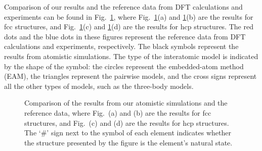 \documentclass[%
 reprint,
 amsmath,amssymb,
 aps,
]{revtex4-1}
\begin{document}
Comparison of our results and the reference data from DFT calculations and experiments can be found in Fig.~\ref{fig:compare}, where Fig.~\ref{fig:compare}(a) and \ref{fig:compare}(b) are the results for fcc structures, and Fig.~\ref{fig:compare}(c) and \ref{fig:compare}(d) are the results for hcp structures.
The red dots and the blue dots in these figures represent the reference data from DFT calculations and experiments, respectively.
The black symbols represent the results from atomistic simulations.
The type of the interatomic model is indicated by the shape of the symbol: the circles represent the embedded-atom method (EAM), the triangles represent the pairwise models, and the cross signs represent all the other types of models, such as the three-body models.
\noindent\begin{figure}
\centering
\noindent\ignorespaces
{}
\newline
{}
\newline
{}
\newline
{}
\caption{\label{fig:compare}
 Comparison of the results from our atomistic simulations and the reference data, where Fig.~(a) and (b) are the results for fcc structures, and Fig.~(c) and (d) are the results for hcp structures.
 The `\#' sign next to the symbol of each element indicates whether the structure presented by the figure is the element's natural state.
}
\end{figure}
\end{document}
